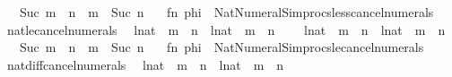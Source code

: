 \begin{isabellebody}
\ \ \ {\isachardoublequoteopen}Suc\ m\ {\isacharless}{\kern0pt}\ n{\isachardoublequoteclose}\ {\isacharbar}{\kern0pt}\ {\isachardoublequoteopen}m\ {\isacharless}{\kern0pt}\ Suc\ n{\isachardoublequoteclose}{\isacharparenright}{\kern0pt}\ {\isacharequal}{\kern0pt}\isanewline
\ \ {\isacartoucheopen}fn\ phi\ {\isacharequal}{\kern0pt}{\isachargreater}{\kern0pt}\ Nat{\isacharunderscore}{\kern0pt}Numeral{\isacharunderscore}{\kern0pt}Simprocs{\isachardot}{\kern0pt}less{\isacharunderscore}{\kern0pt}cancel{\isacharunderscore}{\kern0pt}numerals{\isacartoucheclose}\isanewline
\isanewline
{}\isamarkupfalse%
\ natle{\isacharunderscore}{\kern0pt}cancel{\isacharunderscore}{\kern0pt}numerals\isanewline
\ \ {\isacharparenleft}{\kern0pt}{\isachardoublequoteopen}{\isacharparenleft}{\kern0pt}l{\isacharcolon}{\kern0pt}{\isacharcolon}{\kern0pt}nat{\isacharparenright}{\kern0pt}\ {\isacharplus}{\kern0pt}\ m\ {\isasymle}\ n{\isachardoublequoteclose}\ {\isacharbar}{\kern0pt}\ {\isachardoublequoteopen}{\isacharparenleft}{\kern0pt}l{\isacharcolon}{\kern0pt}{\isacharcolon}{\kern0pt}nat{\isacharparenright}{\kern0pt}\ {\isasymle}\ m\ {\isacharplus}{\kern0pt}\ n{\isachardoublequoteclose}\ {\isacharbar}{\kern0pt}\isanewline
\ \ \ {\isachardoublequoteopen}{\isacharparenleft}{\kern0pt}l{\isacharcolon}{\kern0pt}{\isacharcolon}{\kern0pt}nat{\isacharparenright}{\kern0pt}\ {\isacharasterisk}{\kern0pt}\ m\ {\isasymle}\ n{\isachardoublequoteclose}\ {\isacharbar}{\kern0pt}\ {\isachardoublequoteopen}{\isacharparenleft}{\kern0pt}l{\isacharcolon}{\kern0pt}{\isacharcolon}{\kern0pt}nat{\isacharparenright}{\kern0pt}\ {\isasymle}\ m\ {\isacharasterisk}{\kern0pt}\ n{\isachardoublequoteclose}\ {\isacharbar}{\kern0pt}\isanewline
\ \ \ {\isachardoublequoteopen}Suc\ m\ {\isasymle}\ n{\isachardoublequoteclose}\ {\isacharbar}{\kern0pt}\ {\isachardoublequoteopen}m\ {\isasymle}\ Suc\ n{\isachardoublequoteclose}{\isacharparenright}{\kern0pt}\ {\isacharequal}{\kern0pt}\isanewline
\ \ {\isacartoucheopen}fn\ phi\ {\isacharequal}{\kern0pt}{\isachargreater}{\kern0pt}\ Nat{\isacharunderscore}{\kern0pt}Numeral{\isacharunderscore}{\kern0pt}Simprocs{\isachardot}{\kern0pt}le{\isacharunderscore}{\kern0pt}cancel{\isacharunderscore}{\kern0pt}numerals{\isacartoucheclose}\isanewline
\isanewline
{}\isamarkupfalse%
\ natdiff{\isacharunderscore}{\kern0pt}cancel{\isacharunderscore}{\kern0pt}numerals\isanewline
\ \ {\isacharparenleft}{\kern0pt}{\isachardoublequoteopen}{\isacharparenleft}{\kern0pt}{\isacharparenleft}{\kern0pt}l{\isacharcolon}{\kern0pt}{\isacharcolon}{\kern0pt}nat{\isacharparenright}{\kern0pt}\ {\isacharplus}{\kern0pt}\ m{\isacharparenright}{\kern0pt}\ {\isacharminus}{\kern0pt}\ n{\isachardoublequoteclose}\ {\isacharbar}{\kern0pt}\ {\isachardoublequoteopen}{\isacharparenleft}{\kern0pt}l{\isacharcolon}{\kern0pt}{\isacharcolon}{\kern0pt}nat{\isacharparenright}{\kern0pt}\ {\isacharminus}{\kern0pt}\ {\isacharparenleft}{\kern0pt}m\ {\isacharplus}{\kern0pt}\ n{\isacharparenright}{\kern0pt}{\isachardoublequoteclose}\ {\isacharbar}{\kern0pt}\isanewline

\end{isabellebody}
